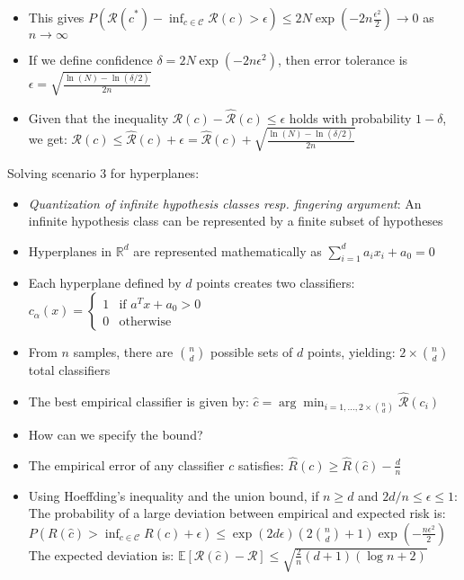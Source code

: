 \begin{itemize}
    \item This gives $P(\mathcal{R}(\hat{c}^*) - \inf_{c \in \mathcal{C}} \mathcal{R}(c) > \epsilon) \leq 2N \exp(-2n\frac{\epsilon^2}{2}) \to 0$ as $n \to \infty$
    \item If we define confidence $\delta = 2N \exp(-2n\epsilon^2)$, then error tolerance is $\epsilon = \sqrt{\frac{\ln(N) - \ln(\delta/2)}{2n}}$
    \item Given that the inequality $\mathcal{R}(c) - \hat{\mathcal{R}}(c) \leq \epsilon$ holds with probability $1-\delta$, we get:
    $\mathcal{R}(c) \leq \hat{\mathcal{R}}(c) + \epsilon = \hat{\mathcal{R}}(c) + \sqrt{\frac{\ln(N) - \ln(\delta/2)}{2n}}$
\end{itemize}
Solving scenario 3 for hyperplanes:
\begin{itemize}
    \item \emph{Quantization of infinite hypothesis classes resp. fingering argument}: An infinite hypothesis class can be represented by a finite subset of hypotheses 
    \item Hyperplanes in $\mathbb{R}^d$ are represented mathematically as
    $
    \sum_{i=1}^d a_i x_i + a_0 = 0
    $
    \item Each hyperplane defined by $ d $ points creates two classifiers:
    $
    c_\alpha(x) = 
    \begin{cases} 
    1 & \text{if } a^T x + a_0 > 0 \\
    0 & \text{otherwise}
    \end{cases}\textbf{}
    $
    \item From $ n $ samples, there are $ \binom{n}{d} $ possible sets of $ d $ points, yielding:
    $
    2 \times \binom{n}{d}
    $
    total classifiers
    \item The best empirical classifier is given by: $ \hat{c} = \arg\min_{i=1,...,2 \times \binom{n}{d}} \hat{\mathcal{R}}(c_i)$
    \item How can we specify the bound?
    \item The empirical error of any classifier $ c $ satisfies:
    $
    \hat{R}(c) \geq \hat{R}(\hat{c}) - \frac{d}{n}
    $
    \item Using Hoeffding's inequality and the union bound, if $n \geq d$ and $2d/n \leq \epsilon \leq 1$: The probability of a large deviation between empirical and expected risk is:
    $
    P\left(R(\hat{c}) > \inf_{c \in \mathcal{C}} R(c) + \epsilon\right) \leq \exp\left(2d\epsilon\right) \left(2 \binom{n}{d} + 1\right) \exp\left(-\frac{n\epsilon^2}{2}\right)
    $\\
    The expected deviation is:
    $\mathbb{E}[\mathcal{R}(\hat{c}) - \mathcal{R}] \leq \sqrt{\frac{2}{n} (d+1) (\log n + 2)}$
\end{itemize}
